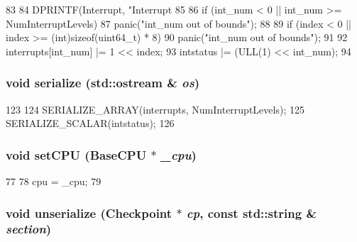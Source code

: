 \begin{DoxyCode}
83     {
84         DPRINTF(Interrupt, "Interrupt %
85 
86         if (int_num < 0 || int_num >= NumInterruptLevels)
87             panic("int_num out of bounds\n");
88 
89         if (index < 0 || index >= (int)sizeof(uint64_t) * 8)
90             panic("int_num out of bounds\n");
91 
92         interrupts[int_num] |= 1 << index;
93         intstatus |= (ULL(1) << int_num);
94     }
\end{DoxyCode}
\hypertarget{classAlphaISA_1_1Interrupts_a53e036786d17361be4c7320d39c99b84}{
\subsubsection[{serialize}]{\setlength{\rightskip}{0pt plus 5cm}void serialize (std::ostream \& {\em os})}}
\label{classAlphaISA_1_1Interrupts_a53e036786d17361be4c7320d39c99b84}



\begin{DoxyCode}
123     {
124         SERIALIZE_ARRAY(interrupts, NumInterruptLevels);
125         SERIALIZE_SCALAR(intstatus);
126     }
\end{DoxyCode}
\hypertarget{classAlphaISA_1_1Interrupts_a2ab8c6aed9969bc58d6aa2427d442cc4}{
\subsubsection[{setCPU}]{\setlength{\rightskip}{0pt plus 5cm}void setCPU ({\bf BaseCPU} $\ast$ {\em \_\-cpu})}}
\label{classAlphaISA_1_1Interrupts_a2ab8c6aed9969bc58d6aa2427d442cc4}



\begin{DoxyCode}
77     {
78         cpu = _cpu;
79     }
\end{DoxyCode}
\hypertarget{classAlphaISA_1_1Interrupts_af22e5d6d660b97db37003ac61ac4ee49}{
\subsubsection[{unserialize}]{\setlength{\rightskip}{0pt plus 5cm}void unserialize ({\bf Checkpoint} $\ast$ {\em cp}, \/  const std::string \& {\em section})}}
\label{classAlphaISA_1_1Interrupts_af22e5d6d660b97db37003ac61ac4ee49}



